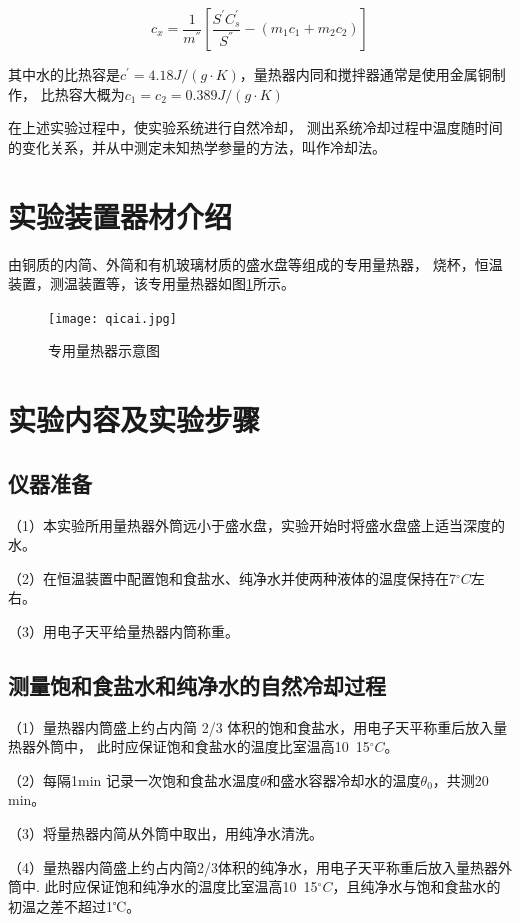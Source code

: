 \documentclass{ctexart}
\begin{document}
    \begin{equation}
      c_{x} = \frac{1}{m^{''}} [\frac{S^{'}C^{'}_{s}}{S^{''}} - (m_{1}c_{1} + m_{2}c_{2})]
    \end{equation}
    
    其中水的比热容是$c^{'} = 4.18 J/(g \cdot K)$，量热器内同和搅拌器通常是使用金属铜制作，
    比热容大概为$c_{1} = c_{2} = 0.389 J/(g \cdot K)$

    在上述实验过程中，使实验系统进行自然冷却，
    测出系统冷却过程中温度随时间的变化关系，并从中测定未知热学参量的方法，叫作冷却法。

\section{实验装置器材介绍}
由铜质的内简、外简和有机玻璃材质的盛水盘等组成的专用量热器，
烧杯，恒温装置，测温装置等，该专用量热器如图\ref{qicai}所示。

\begin{figure}[H]\label{qicai}
  \centering
  \texttt{[image: qicai.jpg]}
  \caption{专用量热器示意图}
\end{figure}

\section{实验内容及实验步骤}
  \subsection{仪器准备}
  （1）本实验所用量热器外筒远小于盛水盘，实验开始时将盛水盘盛上适当深度的水。

  （2）在恒温装置中配置饱和食盐水、纯净水并使两种液体的温度保持在7$^{\circ}C$左右。

  （3）用电子天平给量热器内筒称重。

  \subsection{测量饱和食盐水和纯净水的自然冷却过程}
  （1）量热器内筒盛上约占内简 2/3 体积的饱和食盐水，用电子天平称重后放入量热器外筒中，
  此时应保证饱和食盐水的温度比室温高10~15$^{\circ}C$。

  （2）每隔1min 记录一次饱和食盐水温度$\theta$和盛水容器冷却水的温度$\theta_{0}$，共测20 min。

  （3）将量热器内简从外筒中取出，用纯净水清洗。

  （4）量热器内简盛上约占内简2/3体积的纯净水，用电子天平称重后放入量热器外筒中.
  此时应保证饱和纯净水的温度比室温高10~15$^{\circ}C$，且纯净水与饱和食盐水的初温之差不超过1℃。
\end{document}
